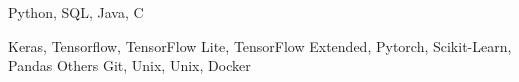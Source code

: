 
\begin{cvskills}
    {Python, SQL, Java, C} %

    {Keras, Tensorflow, TensorFlow Lite, TensorFlow Extended, Pytorch, Scikit-Learn, Pandas} %
  \cvskill
    {Others}
    {Git, Unix, Unix, Docker}
    
\end{cvskills}
